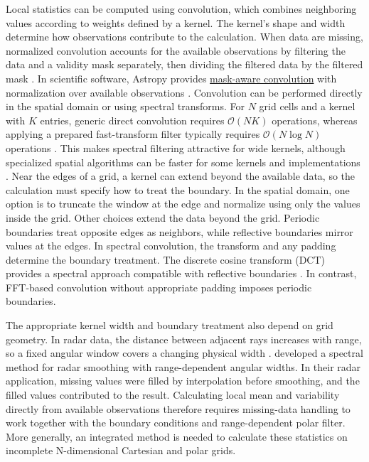 \documentclass[a4paper,fleqn]{cas-sc}
\begin{document}
Local statistics can be computed using convolution, which combines neighboring values according to weights defined by a kernel. The kernel’s shape and width determine how observations contribute to the calculation. When data are missing, normalized convolution accounts for the available observations by filtering the data and a validity mask separately, then dividing the filtered data by the filtered mask \citep{Knutsson1993,Westin1994,Pham2006}. In scientific software, Astropy provides \href{https://docs.astropy.org/en/v8.0.2/api/astropy.convolution.convolve.html}{mask-aware convolution} with normalization over available observations \citep{Astropy2022}.
Convolution can be performed directly in the spatial domain or using spectral transforms. For $N$ grid cells and a kernel with $K$ entries, generic direct convolution requires $\mathcal{O}(NK)$ operations, whereas applying a prepared fast-transform filter typically requires $\mathcal{O}(N\log N)$ operations \citep{Cooley1965,Oppenheim1999,Nussbaumer1982}. This makes spectral filtering attractive for wide kernels, although specialized spatial algorithms can be faster for some kernels and implementations \citep{Smith1997}. Near the edges of a grid, a kernel can extend beyond the available data, so the calculation must specify how to treat the boundary. In the spatial domain, one option is to truncate the window at the edge and normalize using only the values inside the grid. Other choices extend the data beyond the grid. Periodic boundaries treat opposite edges as neighbors, while reflective boundaries mirror values at the edges. In spectral convolution, the transform and any padding determine the boundary treatment. The discrete cosine transform (DCT) \citep{Ahmed1974,Makhoul1980} provides a spectral approach compatible with reflective boundaries \citep{Strang1999,Ng1999,Martucci1994}. In contrast, FFT-based convolution without appropriate padding imposes periodic boundaries.

The appropriate kernel width and boundary treatment also depend on grid geometry. In radar data, the distance between adjacent rays increases with range, so a fixed angular window covers a changing physical width \citep{Bringi2001,Fabry2015}. \citet{Valdivia2026RadarDCT} developed a spectral method for radar smoothing with range-dependent angular widths. In their radar application, missing values were filled by interpolation before smoothing, and the filled values contributed to the result. Calculating local mean and variability directly from available observations therefore requires missing-data handling to work together with the boundary conditions and range-dependent polar filter. More generally, an integrated method is needed to calculate these statistics on incomplete N-dimensional Cartesian and polar grids.
\end{document}
